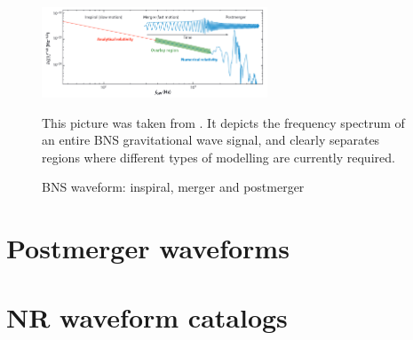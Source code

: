 \begin{figure}[hbt!]
\begin{center}

\includegraphics[width=0.6\textwidth, angle=0]{images/postmerger.png}
\caption{BNS waveform: inspiral, merger and postmerger}
\label{BBH and BNS2}
\end{center}
This picture was taken from \cite{Radice_2020}.  It depicts the frequency spectrum of an entire BNS gravitational wave signal, and clearly separates regions where different types of modelling are currently required. 
\end{figure}

\FloatBarrier

\section{Postmerger waveforms}

\section{NR waveform catalogs}





















